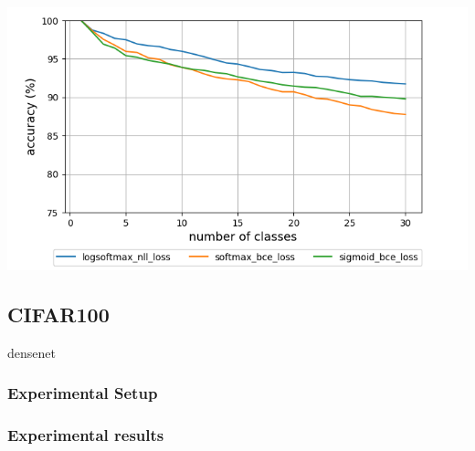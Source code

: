 \documentclass{article}
\begin{document}
\begin{table}[t]
    \mbox{}\hfill
    \begin{minipage}[c]{0.49\textwidth}
    \end{minipage}
    \hfill
    \begin{minipage}[c]{0.49\textwidth}
        \centering
        \includegraphics[scale=0.4,trim={0mm 0mm 0mm 0mm},clip]{res15.png}
    \end{minipage}
    \hfill
    \mbox{}

    \caption{Accuracy of base model(left) and composed model with respect to number of classes(right)}
    \label{table:kws_base}
\end{table}

\subsection{CIFAR100}

densenet ~\cite{huang2017densely}
\subsubsection{Experimental Setup}

\subsubsection{Experimental results}
\end{document}
